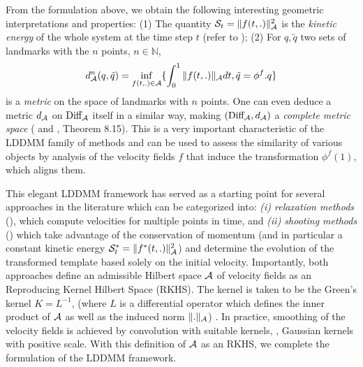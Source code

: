 From the formulation above, we obtain the following interesting geometric interpretations and properties: (1) The quantity ${\cal S}_t=\| f(t,.) \|^2_{\cal{A}}$ is the \textit{kinetic energy} of the whole system at the time step $t$ (refer to \cite{younes2010shapes}); (2) For $q,\tilde q$ two sets of landmarks with the $n$ points, $n\in \mathbb{N}$,
$$
d_{\cal{A}}^n(q,\tilde q)= \inf_{f(t,.)\in \cal{A}} \{\int_{0}^{1}  \| f(t,.) \|_{\cal{A}} dt, \tilde q= \phi^f.q\}
$$
is a \textit{metric} on the space of landmarks with $n$ points. One can even deduce a metric $d_{{\cal A}}$ on $\textrm{Diff}_{\cal{A}}$ itself in a similar way, making $(\textrm{Diff}_{\cal{A}},d_{{\cal A}})$ a \textit{complete metric space} (\cite{trouve1995infinite} and \cite{younes2010shapes}, Theorem 8.15). This is a very important characteristic of the LDDMM family of methods and can be used to assess the similarity of various objects by analysis of the velocity fields $f$ that induce the transformation $\phi^f(1)$, which aligns them.



This elegant LDDMM framework has served as a starting point for several approaches in the literature which can be categorized into: \textit{(i) relaxation methods} (\eg \cite{beg2005computing}), which compute velocities for multiple points in time, and \textit{(ii) shooting methods} (\eg \cite{vialard2012diffeomorphic}) which take advantage of the conservation of momentum (and in particular a constant kinetic energy ${\cal S}^*_t=\| f^{*}(t,.) \|^2_{\cal{A}}$) and determine the evolution of the transformed template based solely on the initial velocity.
Importantly, both approaches define an admissible Hilbert space $\cal A$ of velocity fields as an Reproducing Kernel Hilbert Space (RKHS). The kernel is taken to be the Green’s kernel $K=L^{-1}$, (where $L$ is a differential operator which defines the inner product of $\cal A$ as well as the induced norm $\|.\|_{\cal A}$) \cite{younes2010shapes}. In practice, smoothing of the velocity fields is achieved by convolution with suitable kernels, \eg, Gaussian kernels with positive scale. With this definition of $\cal A$ as an RKHS, we complete the formulation of the LDDMM framework.      

